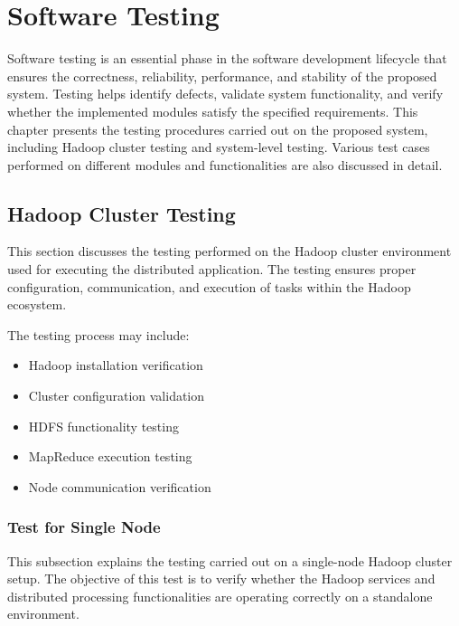 \chapter{Software Testing}

Software testing is an essential phase in the software development lifecycle that ensures the correctness, reliability, performance, and stability of the proposed system. Testing helps identify defects, validate system functionality, and verify whether the implemented modules satisfy the specified requirements. This chapter presents the testing procedures carried out on the proposed system, including Hadoop cluster testing and system-level testing. Various test cases performed on different modules and functionalities are also discussed in detail.


\section{Hadoop Cluster Testing}

This section discusses the testing performed on the Hadoop cluster environment used for executing the distributed application. The testing ensures proper configuration, communication, and execution of tasks within the Hadoop ecosystem.

The testing process may include:
\begin{itemize}
    \item Hadoop installation verification
    \item Cluster configuration validation
    \item HDFS functionality testing
    \item MapReduce execution testing
    \item Node communication verification
\end{itemize}


\subsection{Test for Single Node}

This subsection explains the testing carried out on a single-node Hadoop cluster setup. The objective of this test is to verify whether the Hadoop services and distributed processing functionalities are operating correctly on a standalone environment.

